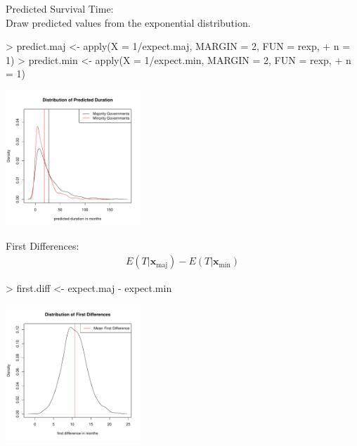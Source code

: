\documentclass[handout]{beamer}
\begin{document}
\begin{frame}[fragile]
\normalsize
Predicted Survival Time:\\
\pause
\bigskip
Draw predicted values from the exponential distribution.
\pause
\tiny
\begin{Schunk}
\begin{Sinput}
> predict.maj <- apply(X = 1/expect.maj, MARGIN = 2, FUN = rexp, 
+     n = 1)
> predict.min <- apply(X = 1/expect.min, MARGIN = 2, FUN = rexp, 
+     n = 1)
\end{Sinput}
\end{Schunk}
\pause
\begin{center}
\includegraphics[width = 2in, height = 2in]{survival_present-predicted.pdf}
\end{center}

\end{frame}

\begin{frame}[fragile]
\normalsize
First Differences:
\pause
\begin{eqnarray*}
E(T | \mathbf{x}_\mathrm{maj}) - E(T | \mathbf{x}_\mathrm{min})
\end{eqnarray*}
\pause
\tiny
\begin{Schunk}
\begin{Sinput}
> first.diff <- expect.maj - expect.min
\end{Sinput}
\end{Schunk}
\pause
\begin{center}
\includegraphics[width = 2in, height = 2in]{survival_present-fd.pdf}
\end{center}

\end{frame}
\end{document}
